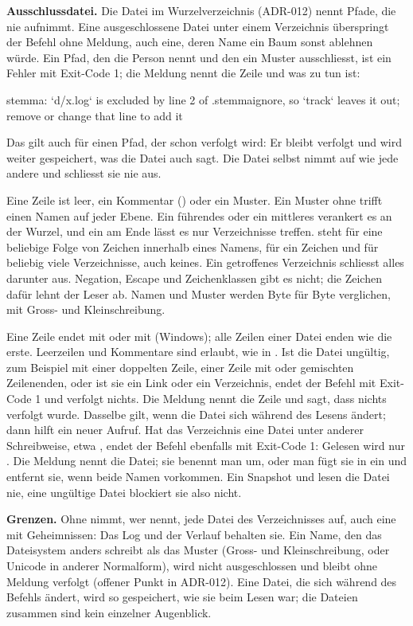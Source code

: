 {\bf Ausschlussdatei.} Die Datei  im Wurzelverzeichnis (ADR-012)
nennt Pfade, die  nie aufnimmt.
Eine ausgeschlossene Datei unter einem Verzeichnis überspringt der Befehl ohne Meldung,
auch eine, deren Name ein Baum sonst ablehnen würde.
Ein Pfad, den die Person nennt und den ein Muster ausschliesst, ist ein Fehler mit Exit-Code 1;
die Meldung nennt die Zeile und was zu tun ist:

\starttyping
stemma: `d/x.log` is excluded by line 2 of .stemmaignore, so `track` leaves it out;
remove or change that line to add it
\stoptyping

Das gilt auch für einen Pfad, der schon verfolgt wird: Er bleibt verfolgt
und wird weiter gespeichert, was die Datei auch sagt.
Die Datei selbst nimmt  auf wie jede andere und schliesst sie nie aus.

Eine Zeile ist leer, ein Kommentar (\type{#}) oder ein Muster.
Ein Muster ohne \type{/} trifft einen Namen auf jeder Ebene.
Ein führendes oder ein mittleres \type{/} verankert es an der Wurzel,
und ein \type{/} am Ende lässt es nur Verzeichnisse treffen.
\type{*} steht für eine beliebige Folge von Zeichen innerhalb eines Namens,
 für ein Zeichen und \type{**} für beliebig viele Verzeichnisse, auch keines.
Ein getroffenes Verzeichnis schliesst alles darunter aus.
Negation, Escape und Zeichenklassen gibt es nicht; die Zeichen dafür lehnt der Leser ab.
Namen und Muster werden Byte für Byte verglichen, mit Gross- und Kleinschreibung.

Eine Zeile endet mit \type{\n} oder mit \type{\r\n} (Windows);
alle Zeilen einer Datei enden wie die erste.
Leerzeilen und Kommentare sind erlaubt, wie in .
Ist die Datei ungültig, zum Beispiel mit einer doppelten Zeile, einer Zeile mit \type{!}
oder gemischten Zeilenenden, oder ist sie ein Link oder ein Verzeichnis,
endet der Befehl mit Exit-Code 1 und verfolgt nichts.
Die Meldung nennt die Zeile und sagt, dass nichts verfolgt wurde.
Dasselbe gilt, wenn die Datei sich während des Lesens ändert; dann hilft ein neuer Aufruf.
Hat das Verzeichnis eine Datei unter anderer Schreibweise, etwa ,
endet der Befehl ebenfalls mit Exit-Code 1: Gelesen wird nur .
Die Meldung nennt die Datei; sie benennt man um, oder man fügt sie in  ein
und entfernt sie, wenn beide Namen vorkommen.
Ein Snapshot und  lesen die Datei nie, eine ungültige Datei blockiert sie also nicht.

{\bf Grenzen.} Ohne  nimmt, wer  nennt, jede Datei des Verzeichnisses
auf, auch eine mit Geheimnissen: Das Log und der Verlauf behalten sie.
Ein Name, den das Dateisystem anders schreibt als das Muster (Gross- und Kleinschreibung, oder
Unicode in anderer Normalform), wird nicht ausgeschlossen und bleibt ohne Meldung verfolgt (offener
Punkt in ADR-012). Eine Datei, die sich während des Befehls ändert, wird so gespeichert, wie sie
beim Lesen war; die Dateien zusammen sind kein einzelner Augenblick.

